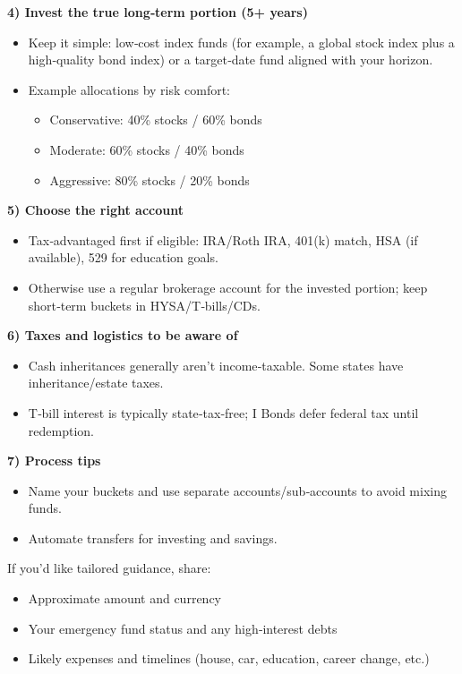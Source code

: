 \begin{responsebox}
\textbf{4) Invest the true long‑term portion (5+ years)}
\begin{itemize}[noitemsep, topsep=0pt]
    \item Keep it simple: low‑cost index funds (for example, a global stock index plus a high‑quality bond index) or a target‑date fund aligned with your horizon.
    \item Example allocations by risk comfort:
    \begin{itemize}[noitemsep]
        \item Conservative: 40\% stocks / 60\% bonds
        \item Moderate: 60\% stocks / 40\% bonds
        \item Aggressive: 80\% stocks / 20\% bonds
    \end{itemize}
\end{itemize}

\textbf{5) Choose the right account}
\begin{itemize}[noitemsep, topsep=0pt]
    \item Tax‑advantaged first if eligible: IRA/Roth IRA, 401(k) match, HSA (if available), 529 for education goals.
    \item Otherwise use a regular brokerage account for the invested portion; keep short‑term buckets in HYSA/T‑bills/CDs.
\end{itemize}

\textbf{6) Taxes and logistics to be aware of}
\begin{itemize}[noitemsep, topsep=0pt]
    \item Cash inheritances generally aren’t income‑taxable. Some states have inheritance/estate taxes.
    \item T‑bill interest is typically state‑tax‑free; I Bonds defer federal tax until redemption.
\end{itemize}

\textbf{7) Process tips}
\begin{itemize}[noitemsep, topsep=0pt]
    \item Name your buckets and use separate accounts/sub‑accounts to avoid mixing funds.
    \item Automate transfers for investing and savings.
\end{itemize}

If you’d like tailored guidance, share:
\begin{itemize}[noitemsep, topsep=0pt]
    \item Approximate amount and currency
    \item Your emergency fund status and any high‑interest debts
    \item Likely expenses and timelines (house, car, education, career change, etc.)
\end{itemize}
\end{responsebox}

